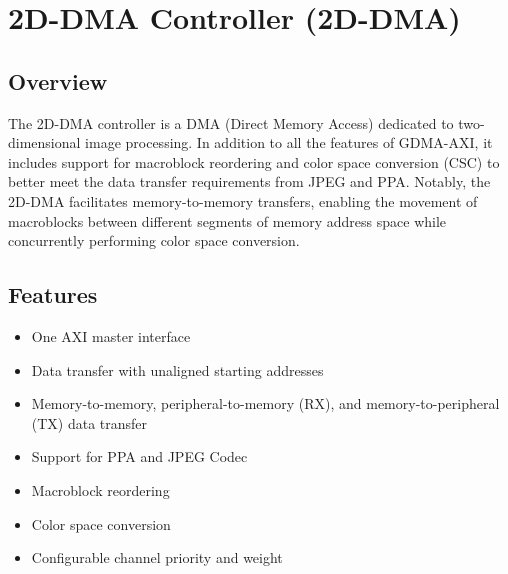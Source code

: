 \documentclass[main\_\_EN.tex]{subfiles}
\begin{document}

\ifglobal
\else
    {\let\clearpage\relax \listoftodos}
    {\let\clearpage\relax \listofdonetodos}
    \tableofcontents
\fi



\hypertarget{2ddma}{}
\chapter{2D-DMA Controller (2D-DMA)}
\label{mod:2ddma}


\section{Overview}

The 2D-DMA controller is a DMA (Direct Memory Access) dedicated to two-dimensional image processing. In addition to all the features of GDMA-AXI, it includes support for macroblock reordering and color space conversion (CSC)  to better meet the data transfer requirements from JPEG and PPA. Notably, the 2D-DMA facilitates memory-to-memory transfers, enabling the movement of macroblocks between different segments of memory address space while concurrently performing color space conversion.



\section{Features}
\label{sec:2ddma-features}

\begin{itemize}
    \item One AXI master interface
    \item Data transfer with unaligned starting addresses
    \item Memory-to-memory, peripheral-to-memory (RX), and memory-to-peripheral (TX) data transfer
    \item Support for PPA and JPEG Codec
    \item Macroblock reordering
    \item Color space conversion
    \item Configurable channel priority and weight
\end{itemize}
\end{document}
